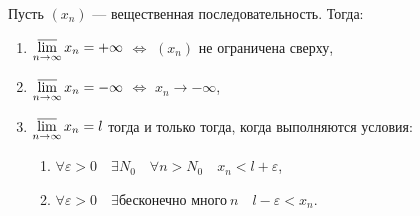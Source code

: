 \hypertarget{техническое описание верхнего предела}{}
\begin{theorem}
	Пусть \((x_n)\) --- вещественная последовательность. Тогда:
	\begin{enumerate}
		\item \(\varlimsup\limits_{n \to \infty} x_n = +\infty\) \(\Leftrightarrow\) \((x_n)\) не ограничена сверху,
		\item \(\varlimsup\limits_{n \to \infty} x_n = -\infty\) \(\Leftrightarrow\) \(x_n \to -\infty\),
		\item \(\varlimsup\limits_{n \to \infty} x_n = l\) тогда и только тогда, когда выполняются условия:
		\begin{enumerate}
			\item \(\forall \varepsilon > 0 \quad \exists N_0 \quad \forall n > N_0 \quad x_n < l + \varepsilon\),
			
			\item \(	\forall \varepsilon > 0 \quad \exists \textit{бесконечно много} \ n \quad l - \varepsilon < x_n\).
		\end{enumerate}
	\end{enumerate}
\end{theorem}

